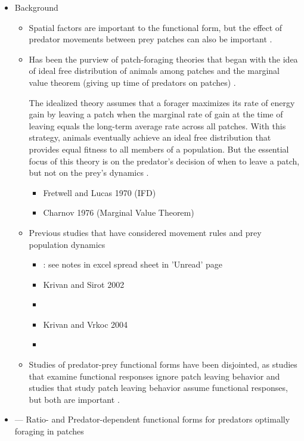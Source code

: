 \documentclass[12pt, a4paper]{article}
\begin{document}
\begin{itemize}
\item Background
\begin{itemize}
\item Spatial factors are important to the functional form, but the effect of predator movements between prey patches can also be important \citep{Anderson2010}. 
\item Has been the purview of patch-foraging theories that began with the idea of ideal free distribution of animals among patches and the marginal value theorem (giving up time of predators on patches) \citep{Anderson2010}. 

The idealized theory assumes that a forager maximizes its rate of energy gain by leaving a patch when the marginal rate of gain at the time of leaving equals the long-term average rate across all patches. With this strategy, animals eventually achieve an ideal free distribution that provides equal fitness to all members of a population. But the essential focus of this theory is on the predator's decision of when to leave a patch, but not on the prey's dynamics \citep{Anderson2010}. 
\begin{itemize}
\item Fretwell and Lucas 1970 (IFD)
\item Charnov 1976 (Marginal Value Theorem)
\end{itemize}
\item Previous studies that have considered movement rules and prey population dynamics
\begin{itemize}
\item \cite{Abrams2007}: see notes in excel spread sheet in 'Unread' page
\item Krivan and Sirot 2002
\item \cite{Cressmanetal2004}
\item Krivan and Vrkoc 2004
\item \cite{Abramsetal2007}
\end{itemize}
\item Studies of predator-prey functional forms have been disjointed, as studies that examine functional responses ignore patch leaving behavior and studies that study patch leaving behavior assume functional responses, but both are important \citep{Anderson2010}.
\end{itemize}
\item \cite{Anderson2010} --- Ratio- and Predator-dependent functional forms for predators optimally  foraging in patches
\end{itemize}


\end{document}
